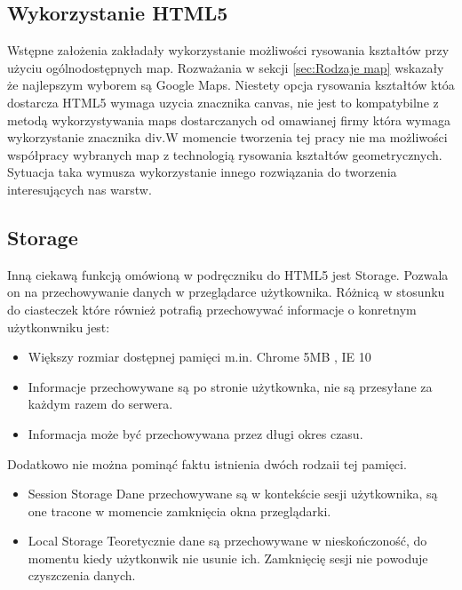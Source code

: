 \subsection{Wykorzystanie HTML5}
\label{subsec:htmluse}

Wstępne założenia zakładały wykorzystanie możliwości rysowania kształtów przy użyciu ogólnodostępnych map. Rozważania w sekcji \ref{sec:Rodzaje map} wskazały że najlepszym wyborem są Google Maps. Niestety opcja rysowania kształtów któa dostarcza HTML5 wymaga uzycia znacznika canvas, nie jest to kompatybilne z metodą wykorzystywania maps dostarczanych od omawianej firmy która wymaga wykorzystanie znacznika div.W momencie tworzenia tej pracy nie ma możliwości współpracy wybranych map z technologią rysowania kształtów geometrycznych. Sytuacja taka wymusza wykorzystanie innego rozwiązania do tworzenia interesujących nas warstw.

\subsection{Storage}
\label{subsec:storage5}
Inną ciekawą funkcją omówioną w podręczniku do HTML5  \cite{html5dive} jest Storage. Pozwala on na przechowywanie danych w przeglądarce użytkownika. Różnicą w stosunku do ciasteczek które również potrafią przechowywać informacje o konretnym użytkonwniku jest:
\begin{itemize}
\item
Większy rozmiar dostępnej pamięci m.in. Chrome 5MB \nocite{chrome5mb}, IE 10
\item
Informacje przechowywane są po stronie użytkownka, nie są przesyłane za każdym razem do serwera.
\item
Informacja może być przechowywana przez długi okres czasu.
\end{itemize}



Dodatkowo nie można pominąć faktu istnienia dwóch rodzaii tej pamięci.
\begin{itemize}

\item
Session Storage
Dane przechowywane są w kontekście sesji użytkownika, są one tracone w momencie zamknięcia okna przeglądarki.

\item
Local Storage
Teoretycznie dane są przechowywane w nieskończoność, do momentu kiedy użytkonwik nie usunie ich. Zamknięcię sesji nie powoduje czyszczenia danych.

\end{itemize}

